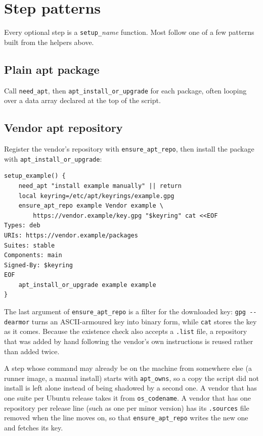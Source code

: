 \documentclass[11pt,a4paper]{article}
\newcommand{\cmd}[1]{\texttt{#1}}
\begin{document}
\section{Step patterns}

Every optional step is a \cmd{setup\_}\textit{name} function. Most follow one of a few
patterns built from the helpers above.

\subsection{Plain apt package}
Call \cmd{need\_apt}, then \cmd{apt\_install\_or\_upgrade} for each package, often
looping over a data array declared at the top of the script.

\subsection{Vendor apt repository}
Register the vendor's repository with \cmd{ensure\_apt\_repo}, then install the
package with \cmd{apt\_install\_or\_upgrade}:

\begin{lstlisting}
setup_example() {
    need_apt "install example manually" || return
    local keyring=/etc/apt/keyrings/example.gpg
    ensure_apt_repo example Vendor example \
        https://vendor.example/key.gpg "$keyring" cat <<EOF
Types: deb
URIs: https://vendor.example/packages
Suites: stable
Components: main
Signed-By: $keyring
EOF
    apt_install_or_upgrade example example
}
\end{lstlisting}

\noindent The last argument of \cmd{ensure\_apt\_repo} is a filter for the downloaded key:
\cmd{gpg -{}-dearmor} turns an ASCII-armoured key into binary form, while \cmd{cat}
stores the key as it comes. Because the existence check also accepts a \cmd{.list}
file, a repository that was added by hand following the vendor's own instructions
is reused rather than added twice.

\noindent A step whose command may already be on the machine from somewhere else (a
runner image, a manual install) starts with \cmd{apt\_owns}, so a copy the script did not
install is left alone instead of being shadowed by a second one. A vendor that has one
suite per Ubuntu release takes it from \cmd{os\_codename}. A vendor that has one repository
per release line (such as one per minor version) has its \cmd{.sources} file removed when
the line moves on, so that \cmd{ensure\_apt\_repo} writes the new one and fetches its key.
\end{document}
